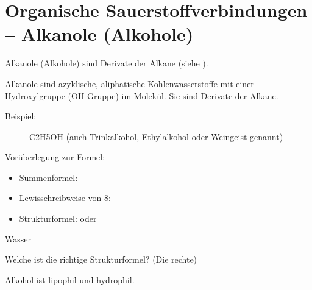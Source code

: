 \section{Organische Sauerstoffverbindungen -- Alkanole (Alkohole)}
\label{sec:Alkanole}
Alkanole (Alkohole) sind Derivate der Alkane (siehe ).

Alkanole sind azyklische, aliphatische Kohlenwasserstoffe mit einer
Hydroxylgruppe (OH-Gruppe) im Molekül.
Sie sind Derivate der Alkane.

\begin{description}
	\item[Beispiel:] \ac{C2H5OH} (auch Trinkalkohol, Ethylalkohol oder Weingeist genannt)
\end{description}

\begin{list}{}{}
	\item[Vorüberlegung zur Formel:]~
	\begin{itemize}
		\item Summenformel: 
		\item Lewisschreibweise von \ac{8}: 
		\item Strukturformel:
			\hspace{2em}oder\hspace{2em}
	\end{itemize}
\end{list}

\begin{minipage}{6em}
\end{minipage}
\begin{minipage}{5em}
Wasser
\end{minipage}

Welche ist die richtige Strukturformel? (Die rechte)

Alkohol ist lipophil und hydrophil.

